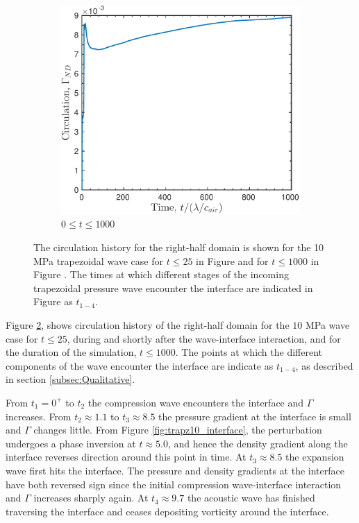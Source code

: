 \documentclass{article}
\begin{document}
\begin{figure}[!h]
\begin{subfigure}[b]{0.48\textwidth}
    \includegraphics[width=\textwidth]{./figs/lung_figs/Gamma_t1000_28-Oct-2016}
    \caption{\label{fig:trapz10_circ_schematic_t1000} $0\leq t \leq 1000$}
  \end{subfigure}
  \caption[Circulation deposition by the 10 MPa trapezoidal wave] {The
    circulation history for the right-half domain is shown for the 10
    MPa trapezoidal wave case for $t\leq25$ in Figure
    \protect{} and for
    $t\leq1000$ in Figure
    \protect{}. The times at
    which different stages of the incoming trapezoidal pressure wave
    encounter the interface are indicated in Figure
    \protect{} as $t_{1-4}$.}
  \label{fig:trapz10_circ_schematic}
\end{figure}


Figure \ref{fig:trapz10_circ_schematic}, shows circulation history of
the right-half domain for the $10$ MPa wave case for $t\leq25$, during
and shortly after the wave-interface interaction, and for the duration
of the simulation, $t\leq1000$. The points at which the different
components of the wave encounter the interface are indicate as
$t_{1-4}$, as described in section \ref{subsec:Qualitative}.

From $t_1=0^+$ to $t_2$ the compression wave encounters the interface
and $\Gamma$ increases. From $t_2\approx1.1$ to $t_3\approx8.5$ the
pressure gradient at the interface is small and $\Gamma$ changes
little. From Figure \ref{fig:trapz10_interface}, the perturbation
undergoes a phase inversion at $t\approx 5.0$, and hence the density
gradient along the interface reverses direction around this point in
time. At $t_3\approx8.5$ the expansion wave first hits the
interface. The pressure and density gradients at the interface have
both reversed sign since the initial compression wave-interface
interaction and $\Gamma$ increases sharply again. At
$t_4\approx9.7$ the acoustic wave has finished traversing the
interface and ceases depositing vorticity around the interface.
\end{document}
